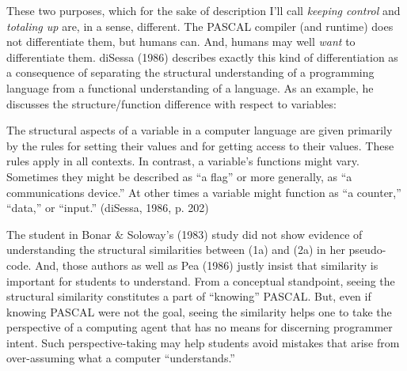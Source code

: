 These two purposes, which for the sake of description I'll call
\emph{keeping control} and \emph{totaling up} are, in a sense,
different. The PASCAL compiler (and runtime) does not differentiate
them, but humans can. And, humans may well \emph{want} to differentiate
them. diSessa (1986) describes exactly this kind of differentiation as a
consequence of separating the structural understanding of a programming
language from a functional understanding of a language. As an example,
he discusses the structure/function difference with respect to
variables:

The structural aspects of a variable in a computer language are given
primarily by the rules for setting their values and for getting access
to their values. These rules apply in all contexts. In contrast, a
variable's functions might vary. Sometimes they might be described as
``a flag'' or more generally, as ``a communications device.'' At other
times a variable might function as ``a counter,'' ``data,'' or
``input.'' (diSessa, 1986, p. 202)

The student in Bonar \& Soloway's (1983) study did not show evidence of
understanding the structural similarities between (1a) and (2a) in her
pseudo-code. And, those authors as well as Pea (1986) justly insist that
similarity is important for students to understand. From a conceptual
standpoint, seeing the structural similarity constitutes a part of
``knowing'' PASCAL. But, even if knowing PASCAL were not the goal,
seeing the similarity helps one to take the perspective of a computing
agent that has no means for discerning programmer intent. Such
perspective-taking may help students avoid mistakes that arise from
over-assuming what a computer ``understands.''

